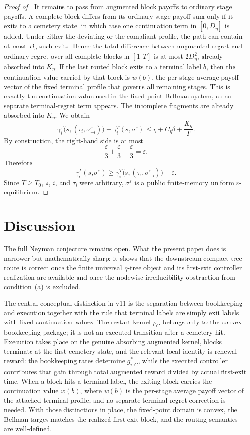 \documentclass[12pt]{article}
\theoremstyle{definition}
\newcommand{\eps}{\varepsilon}
\newcommand{\1}{\mathbf{1}}
\begin{document}
\begin{proof}[Proof of ]
It remains to pass from augmented block payoffs to ordinary stage payoffs. A
complete block differs from its ordinary stage-payoff sum only if it exits to a
cemetery state, in which case one continuation term in $[0,D_\eta]$ is added.
Under either the deviating or the compliant profile, the path can contain at
most $D_\eta$ such exits. Hence the total difference between augmented regret
and ordinary regret over all complete blocks in $[1,T]$ is at most
$2D_\eta^2$, already absorbed into $K_\eta$. If the last routed block exits to a
terminal label $b$, then the continuation value carried by that block is
$w(b)$, the per-stage average payoff vector of the fixed terminal profile that
governs all remaining stages. This is exactly the continuation value used in the
fixed-point Bellman system, so no separate terminal-regret term appears. The
incomplete fragments are already absorbed into $K_\eta$. We obtain
\[
\gamma_i^T\bigl(s,(\tau_i,\sigma^\eps_{-i})\bigr)
-
\gamma_i^T(s,\sigma^\eps)
\le
\eta + C_\eta\delta + \frac{K_\eta}{T}.
\]
By construction, the right-hand side is at most
\[
\frac{\eps}{3}+\frac{\eps}{3}+\frac{\eps}{3}=\eps.
\]
Therefore
\[
\gamma_i^T(s,\sigma^\eps)
\ge
\gamma_i^T\bigl(s,(\tau_i,\sigma^\eps_{-i})\bigr)-\eps.
\]
Since $T\ge T_0$, $s$, $i$, and $\tau_i$ were arbitrary, $\sigma^\eps$ is a
public finite-memory uniform $\eps$-equilibrium.
\end{proof}


\section{Discussion}

The full Neyman conjecture remains open. What the present paper does is narrower
but mathematically sharp: it shows that the downstream compact-tree route is
correct once the finite universal $\eta$-tree object and its first-exit controller
realization are available and once the nodewise irreducibility obstruction from
condition~\textnormal{(a)} is excluded.

The central conceptual distinction in v11 is the separation between bookkeeping
and execution together with the rule that terminal labels are simply exit labels
with fixed continuation values. The restart kernel $\rho_C$ belongs only to the
convex bookkeeping package; it is not an executed transition after a cemetery
hit. Execution takes place on the genuine absorbing augmented kernel, blocks
terminate at the first cemetery state, and the relevant local identity is
renewal-reward: the bookkeeping rates determine $g_{i,C}^*$, while the executed
controller contributes that gain through total augmented reward divided by
actual first-exit time. When a block hits a terminal label, the exiting block
carries the continuation value $w(b)$, where $w(b)$ is the per-stage average
payoff vector of the attached terminal profile, and no separate terminal-regret
correction is needed. With those distinctions in place, the fixed-point domain
is convex, the Bellman target matches the realized first-exit block, and the
routing semantics are well-defined.
\end{document}
